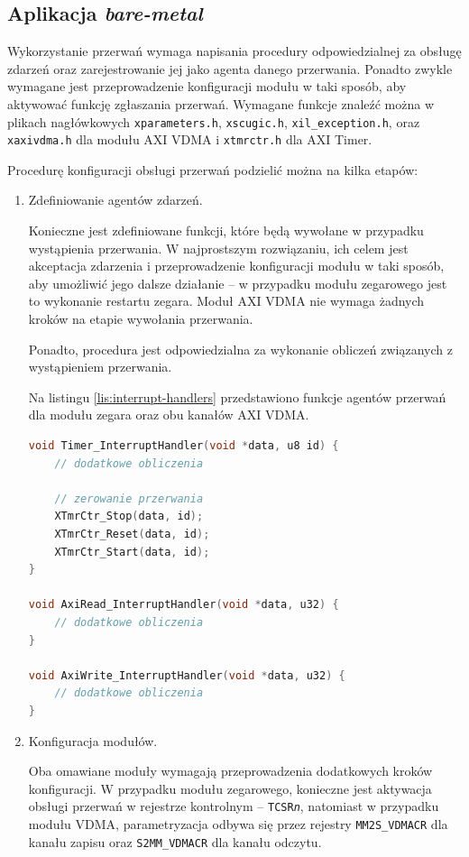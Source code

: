 \subsection{Aplikacja \textit{bare-metal}}

Wykorzystanie przerwań wymaga napisania procedury odpowiedzialnej za obsługę zdarzeń oraz zarejestrowanie jej jako agenta danego przerwania.
Ponadto zwykle wymagane jest przeprowadzenie konfiguracji modułu w taki sposób, aby aktywować funkcję zgłaszania przerwań. 
Wymagane funkcje znaleźć można w plikach nagłówkowych \texttt{xparameters.h}, \texttt{xscugic.h}, \texttt{xil\_exception.h}, oraz \texttt{xaxivdma.h} dla modułu AXI VDMA i \texttt{xtmrctr.h} dla AXI Timer.

Procedurę konfiguracji obsługi przerwań podzielić można na kilka etapów:
\begin{enumerate}
	\item Zdefiniowanie agentów zdarzeń.
	
Konieczne jest zdefiniowane funkcji, które będą wywołane w przypadku wystąpienia przerwania. 
W najprostszym rozwiązaniu, ich celem jest akceptacja zdarzenia i przeprowadzenie konfiguracji modułu w taki sposób, aby umożliwić jego dalsze działanie -- w przypadku modułu zegarowego jest to wykonanie restartu zegara. 
Moduł AXI VDMA nie wymaga żadnych kroków na etapie wywołania przerwania.

Ponadto, procedura jest odpowiedzialna za wykonanie obliczeń związanych z wystąpieniem przerwania.

Na listingu \ref{lis:interrupt-handlers} przedstawiono funkcje agentów przerwań dla modułu zegara oraz obu kanałów AXI VDMA.

\begin{lstlisting}[breaklines=true, language=C, caption=Procedury obsługi przerwań., label=lis:interrupt-handlers]
void Timer_InterruptHandler(void *data, u8 id) {
	// dodatkowe obliczenia
	
	// zerowanie przerwania
	XTmrCtr_Stop(data, id);
	XTmrCtr_Reset(data, id);
	XTmrCtr_Start(data, id);
}

void AxiRead_InterruptHandler(void *data, u32) {
	// dodatkowe obliczenia
}

void AxiWrite_InterruptHandler(void *data, u32) {
	// dodatkowe obliczenia
}
\end{lstlisting}

	\item Konfiguracja modułów.
	
Oba omawiane moduły wymagają przeprowadzenia dodatkowych kroków konfiguracji. 
W przypadku modułu zegarowego, konieczne jest aktywacja obsługi przerwań w rejestrze kontrolnym -- \texttt{TCSR\textit{n}}, natomiast w przypadku modułu VDMA, parametryzacja odbywa się przez rejestry \texttt{MM2S\_VDMACR} dla kanału zapisu oraz \texttt{S2MM\_VDMACR} dla kanału odczytu.


\end{enumerate}
